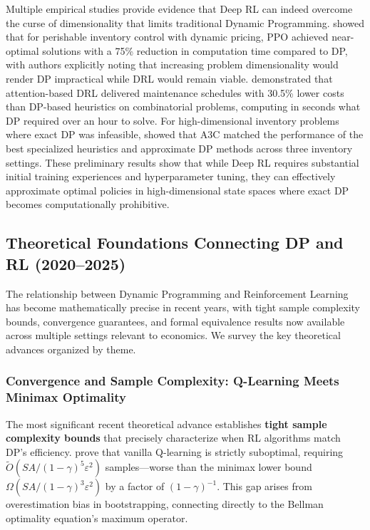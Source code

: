 Multiple empirical studies provide evidence that Deep RL can indeed overcome the curse of dimensionality that limits traditional Dynamic Programming. \cite{nomura2025} showed that for perishable inventory control with dynamic pricing, PPO achieved near-optimal solutions with a 75\% reduction in computation time compared to DP, with authors explicitly noting that increasing problem dimensionality would render DP impractical while DRL would remain viable. \cite{sabri2024} demonstrated that attention-based DRL delivered maintenance schedules with 30.5\% lower costs than DP-based heuristics on combinatorial problems, computing in seconds what DP required over an hour to solve. For high-dimensional inventory problems where exact DP was infeasible, \cite{boute2022} showed that A3C matched the performance of the best specialized heuristics and approximate DP methods across three inventory settings. These preliminary results show that while Deep RL requires substantial initial training experiences and hyperparameter tuning, they can effectively approximate optimal policies in high-dimensional state spaces where exact DP becomes computationally prohibitive.

\subsection{Theoretical Foundations Connecting DP and RL (2020--2025)}

The relationship between Dynamic Programming and Reinforcement Learning has become mathematically precise in recent years, with tight sample complexity bounds, convergence guarantees, and formal equivalence results now available across multiple settings relevant to economics. We survey the key theoretical advances organized by theme.

\subsubsection{Convergence and Sample Complexity: Q-Learning Meets Minimax Optimality}

The most significant recent theoretical advance establishes \textbf{tight sample complexity bounds} that precisely characterize when RL algorithms match DP's efficiency. \citet{li2024minimax} prove that vanilla Q-learning is strictly suboptimal, requiring $\tilde{O}(SA/(1-\gamma)^5\varepsilon^2)$ samples---worse than the minimax lower bound $\Omega(SA/(1-\gamma)^3\varepsilon^2)$ by a factor of $(1-\gamma)^{-1}$. This gap arises from overestimation bias in bootstrapping, connecting directly to the Bellman optimality equation's maximum operator.

